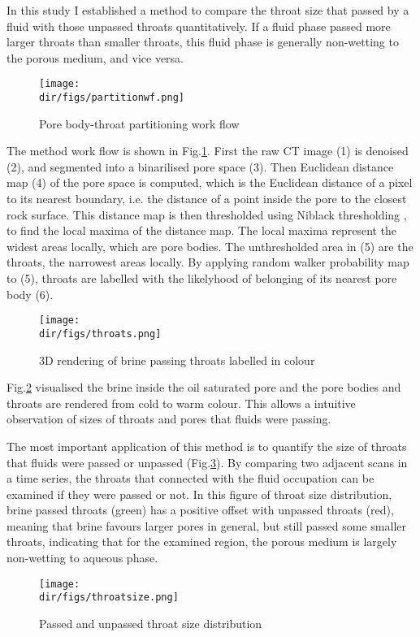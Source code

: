 In this study I established a method to compare the throat size that passed by a fluid with those unpassed throats quantitatively. If a fluid phase passed more larger throats than smaller throats, this fluid phase is generally non-wetting to the porous medium, and vice versa.

\begin{figure}[htbp]
  \centering
  \texttt{[image: \\dir/figs/partitionwf.png]}
  \caption{Pore body-throat partitioning work flow}
  \label{partitionwf}
\end{figure}

The method work flow is shown in Fig.\ref{partitionwf}. First the raw CT image (1) is denoised (2), and segmented into a binarilised pore space (3). Then Euclidean distance map (4) of the pore space is computed, which is the Euclidean distance of a pixel to its nearest boundary, i.e. the distance of a point inside the pore to the closest rock surface. This distance map is then thresholded using Niblack thresholding \citep{niblack1985introduction}, to find the local maxima of the distance map. The local maxima represent the widest areas locally, which are pore bodies. The unthresholded area in (5) are the throats, the narrowest areas locally. By applying random walker probability map to (5), throats are labelled with the likelyhood of belonging of its nearest pore body (6). 

\begin{figure}[htbp]
  \centering
  \texttt{[image: \\dir/figs/throats.png]}
  \caption{3D rendering of brine passing throats labelled in colour}
  \label{throats}
\end{figure}

Fig.\ref{throats} visualised the brine inside the oil saturated pore and the pore bodies and throats are rendered from cold to warm colour. This allows a intuitive observation of sizes of throats and pores that fluids were passing.

The most important application of this method is to quantify the size of throats that fluids were passed or unpassed (Fig.\ref{throatsize}). By comparing two adjacent scans in a time series, the throats that connected with the fluid occupation can be examined if they were passed or not. In this figure of throat size distribution, brine passed throats (green) has a positive offset with unpassed throats (red), meaning that brine favours larger pores in general, but still passed some smaller throats, indicating that for the examined region, the porous medium is largely non-wetting to aqueous phase.

\begin{figure}[htbp]
  \centering
  \texttt{[image: \\dir/figs/throatsize.png]}
  \caption{Passed and unpassed throat size distribution}
  \label{throatsize}
\end{figure}


\newpage






